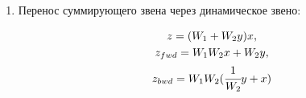 \begin{enumerate}
    \item Перенос суммирующего звена через динамическое звено:
    \begin{figure}[h!]
        \begin{minipage}[h]{0.5\linewidth}
        \end{minipage}
        \begin{minipage}[h]{0.5\linewidth}
            \begin{gather}
                z = (W_1+W_2 y) x, \\
                z_{fwd} = W_1 W_2 x + W_2 y, \\
                z_{bwd} = W_1 W_2 (\cfrac{1}{W_2}y + x)
            \end{gather}
        \end{minipage}
    \end{figure}    
\end{enumerate}
    